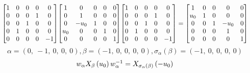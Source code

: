 \documentclass[11pt]{article}
\theoremstyle{definition}
\begin{document}
\[
\scaletoalign{\textwidth}{{\left[\begin{matrix}1 & 0 & 0 & 0 & 0\\0 & 0 & 0 & 1 & 0\\0 & 0 & 1 & 0 & 0\\0 & 1 & 0 & 0 & 0\\0 & 0 & 0 & 0 & -1\end{matrix}\right]} {\left[\begin{matrix}1 & 0 & 0 & 0 & 0\\0 & 1 & 0 & 0 & 0\\0 & - u_{0} & 1 & 0 & 0\\u_{0} & 0 & 0 & 1 & 0\\0 & 0 & 0 & 0 & 1\end{matrix}\right]} {\left[\begin{matrix}1 & 0 & 0 & 0 & 0\\0 & 0 & 0 & 1 & 0\\0 & 0 & 1 & 0 & 0\\0 & 1 & 0 & 0 & 0\\0 & 0 & 0 & 0 & -1\end{matrix}\right]} = {\left[\begin{matrix}1 & 0 & 0 & 0 & 0\\u_{0} & 1 & 0 & 0 & 0\\0 & 0 & 1 & - u_{0} & 0\\0 & 0 & 0 & 1 & 0\\0 & 0 & 0 & 0 & 1\end{matrix}\right]}}
\]
\[
\alpha = \left( 0, \  -1, \  0, \  0, \  0\right), \beta = \left( -1, \  0, \  0, \  0, \  0\right), \sigma_{\alpha}(\beta) = \left( -1, \  0, \  0, \  0, \  0\right)
\]
\[
\scaletoalign{\textwidth}{w_{\alpha} X_{\beta}\left(u_{0}\right) w_{\alpha}^{-1} = X_{\sigma_{\alpha}\left(\beta\right)}\left(- u_{0}\right)}
\]
\end{document}
